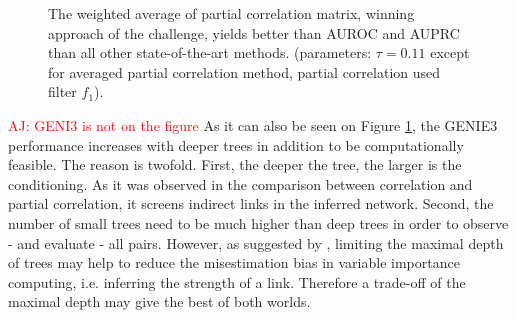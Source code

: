 \documentclass[wcp]{jmlr}
\begin{document}
\begin{figure}[bth]
\centering
{}
\caption{The weighted average of partial correlation matrix, winning approach
         of the challenge, yields better than AUROC and AUPRC than all
         other state-of-the-art methods. (parameters: $\tau=0.11$ except for
         averaged partial correlation method, partial correlation used
         filter $f_1$).}
\label{fig:curves}
\end{figure}



\textcolor{red}{AJ: GENI3 is not on the figure}
As it can also be seen on Figure \ref{fig:curves}, the GENIE3 performance
increases with deeper trees in addition to be computationally feasible. The
reason is twofold. First, the deeper the tree, the larger is the conditioning.
As it was observed in the comparison between correlation and partial
correlation, it screens indirect links in the inferred network. Second, the
number of small trees need to be much higher than deep trees in order to
observe - and evaluate - all pairs.  However, as suggested by
\cite{louppe2014understanding}, limiting the maximal depth of trees may help
to reduce the misestimation bias in variable importance computing, i.e.
inferring the strength of a link. Therefore a trade-off of the maximal depth
may give the best of both worlds.

\end{document}

